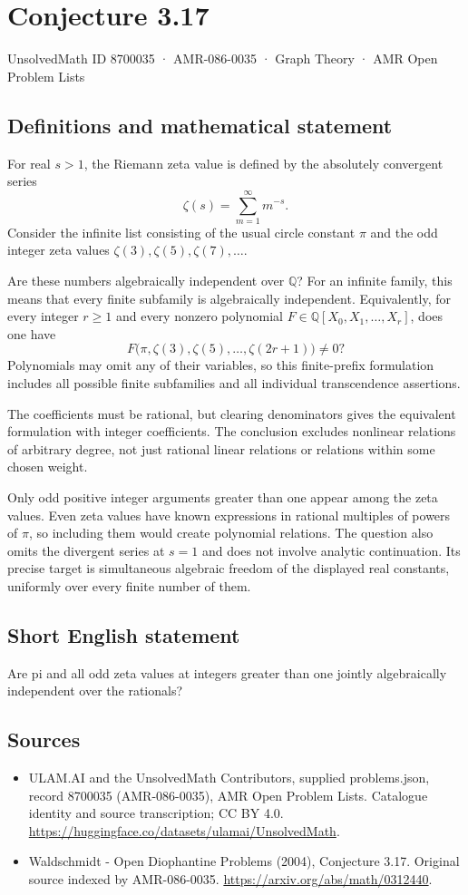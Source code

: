 \documentclass[11pt,a4paper]{article}
\begin{document}
\section*{Conjecture 3.17}\label{8700035}
{\small UnsolvedMath ID 8700035 · AMR-086-0035 · Graph Theory · AMR Open Problem Lists}
\subsection{Definitions and mathematical statement}
For real $s>1$, the Riemann zeta value is defined by the absolutely convergent series
\[
\zeta(s)=\sum_{m=1}^{\infty}m^{-s}.
\]
Consider the infinite list consisting of the usual circle constant $\pi$ and the odd integer zeta values $\zeta(3),\zeta(5),\zeta(7),\ldots$.

Are these numbers algebraically independent over $\mathbb Q$? For an infinite family, this means that every finite subfamily is algebraically independent. Equivalently, for every integer $r\ge1$ and every nonzero polynomial $F\in\mathbb Q[X_0,X_1,\ldots,X_r]$, does one have
\[
F\bigl(\pi,\zeta(3),\zeta(5),\ldots,\zeta(2r+1)\bigr)\ne0?
\]
Polynomials may omit any of their variables, so this finite-prefix formulation includes all possible finite subfamilies and all individual transcendence assertions.

The coefficients must be rational, but clearing denominators gives the equivalent formulation with integer coefficients. The conclusion excludes nonlinear relations of arbitrary degree, not just rational linear relations or relations within some chosen weight.

Only odd positive integer arguments greater than one appear among the zeta values. Even zeta values have known expressions in rational multiples of powers of $\pi$, so including them would create polynomial relations. The question also omits the divergent series at $s=1$ and does not involve analytic continuation. Its precise target is simultaneous algebraic freedom of the displayed real constants, uniformly over every finite number of them.
\subsection{Short English statement}
Are pi and all odd zeta values at integers greater than one jointly algebraically independent over the rationals?
\subsection{Sources}
\begin{itemize}
\item[S1] ULAM.AI and the UnsolvedMath Contributors, supplied problems.json, record 8700035 (AMR-086-0035), AMR Open Problem Lists. Catalogue identity and source transcription; CC BY 4.0.
\url{https://huggingface.co/datasets/ulamai/UnsolvedMath}.
\item[S2] Waldschmidt - Open Diophantine Problems (2004), Conjecture 3.17. Original source indexed by AMR-086-0035.
\url{https://arxiv.org/abs/math/0312440}.
\end{itemize}
\end{document}
